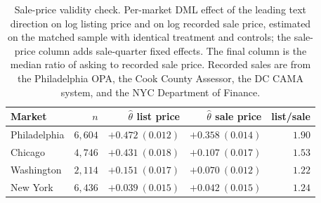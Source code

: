 \begin{table}[H]
\centering
\caption{Sale-price validity check. Per-market DML effect of the leading text
direction on log listing price and on log recorded sale price, estimated on the
matched sample with identical treatment and controls; the sale-price column adds
sale-quarter fixed effects. The final column is the median ratio of asking to
recorded sale price. Recorded sales are from the Philadelphia OPA, the Cook County
Assessor, the DC CAMA system, and the NYC Department of Finance.}
\label{tab:saleprice}
\small
\begin{tabular}{lrrrr}
\toprule
Market & $n$ & $\hat\theta$ list price & $\hat\theta$ sale price & list/sale \\
\midrule
Philadelphia & $6{,}604$ & $+0.472\ (0.012)$ & $+0.358\ (0.014)$ & $1.90$ \\
Chicago      & $4{,}746$ & $+0.431\ (0.018)$ & $+0.107\ (0.017)$ & $1.53$ \\
Washington   & $2{,}114$ & $+0.151\ (0.017)$ & $+0.070\ (0.012)$ & $1.22$ \\
New York     & $6{,}436$ & $+0.039\ (0.015)$ & $+0.042\ (0.015)$ & $1.24$ \\
\bottomrule
\end{tabular}
\end{table}
